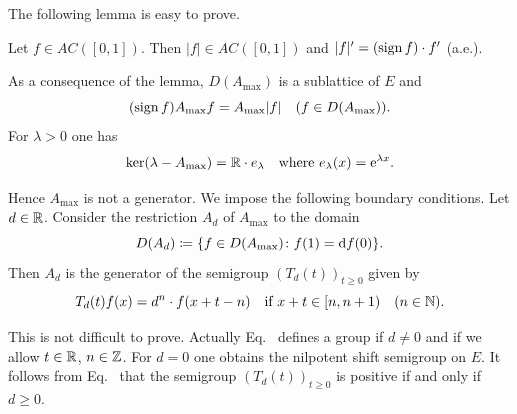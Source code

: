 The following lemma is easy to prove.
\begin{lemma}\label{lem:c2-3.14}
Let $f \in AC([0,1])$. 
Then $|f| \in AC([0,1])$ and $|f|' = (\operatorname{sign}  f) \cdot f'$ (a.e.).
\end{lemma}
As a consequence of the lemma, $D(A_{\max})$ is a sublattice of\/ $E$ and
\begin{equation}\label{eq:c2-3.7}
(\operatorname{sign}  f)A_{\max}f = A_{\max}|f| \quad (f \in D(A_{\max})).
\end{equation}
For $\lambda > 0$ one has
\begin{equation}\label{eq:c2-3.8}
\text{ker}(\lambda - A_{\max}) = \mathbb{R} \cdot e_{\lambda} \quad \text{where }  e_{\lambda}(x) = \mathrm{e}^{\lambda x}.
\end{equation}

Hence $A_{\max}$ is not a generator. 
We impose the following boundary conditions.
Let $d \in \mathbb{R}$. 
Consider the restriction $A_{d}$ of\/ $A_{\max}$ to the domain
\begin{equation*}
D(A_{d}) \coloneq \{f \in D(A_{\max}) \colon f(1) = \mathop{}\!\mathrm{d}{}f(0)\}.
\end{equation*}
Then $A_{d}$ is the generator of the semigroup $(T_{d}(t))_{t \geq 0}$ given by
\begin{equation}\label{eq:c2-3.9}
T_{d}(t)f(x) = d^{n} \cdot f(x+t-n) \quad \text{if } x+t \in [n, n+1) \quad (n \in \mathbb{N} ).
\end{equation}

This is not difficult to prove. 
Actually Eq.~ defines a group if\/ $d \neq 0$ and if we allow $t \in \mathbb{R}$, $n \in \mathbb{Z} $. For $d = 0$ one obtains the nilpotent shift semigroup on $E$.
It follows from Eq.~ that the semigroup $(T_{d}(t))_{t \geq 0}$ is positive if and only if\/ $d \geq 0$.

